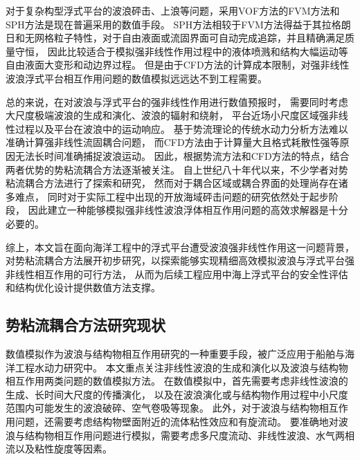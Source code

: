 对于复杂构型浮式平台的波浪砰击、上浪等问题，采用VOF方法的FVM方法和SPH方法是现在普遍采用的数值手段。%
SPH方法相较于FVM方法得益于其拉格朗日和无网格粒子特性，对于自由液面或流固界面可自动完成追踪，并且精确满足质量守恒，%
因此比较适合于模拟强非线性作用过程中的液体喷溅和结构大幅运动等自由液面大变形和动边界过程。%
但是由于CFD方法的计算成本限制，对强非线性波浪浮式平台相互作用问题的数值模拟远远达不到工程需要。%

总的来说，在对波浪与浮式平台的强非线性作用进行数值预报时，%
需要同时考虑大尺度极端波浪的生成和演化、波浪的辐射和绕射，%
平台近场小尺度区域强非线性过程以及平台在波浪中的运动响应。%
基于势流理论的传统水动力分析方法难以准确计算强非线性流固耦合问题，%
而CFD方法由于计算量大且格式耗散性强等原因无法长时间准确捕捉波浪运动。%
因此，根据势流方法和CFD方法的特点，结合两者优势的势粘流耦合方法逐渐被关注。%
自上世纪八十年代以来，不少学者对势粘流耦合方法进行了探索和研究，%
然而对于耦合区域或耦合界面的处理尚存在诸多难点，%
同时对于实际工程中出现的开放海域砰击问题的研究依然处于起步阶段\cite{choiGrid2GridHOSWrapper2017}，%
因此建立一种能够模拟强非线性波浪浮体相互作用问题的高效求解器是十分必要的。%

综上，本文旨在面向海洋工程中的浮式平台遭受波浪强非线性作用这一问题背景，%
对势粘流耦合方法展开初步研究，以探索能够实现精细高效模拟波浪与浮式平台强非线性相互作用的可行方法，%
从而为后续工程应用中海上浮式平台的安全性评估和结构优化设计提供数值方法支撑。%

\subsection{
  \texorpdfstring{势粘流耦合方法研究现状} %
  {\thesubsection 势粘流耦合方法研究现状} %
}
\label{ssec:势粘流耦合方法研究现状}

数值模拟作为波浪与结构物相互作用研究的一种重要手段，被广泛应用于船舶与海洋工程水动力研究中。%
本文重点关注非线性波浪的生成和演化以及波浪与结构物相互作用两类问题的数值模拟方法。%
在数值模拟中，首先需要考虑非线性波浪的生成、长时间大尺度的传播演化，%
以及在波浪演化或与结构物作用过程中小尺度范围内可能发生的波浪破碎、空气卷吸等现象。%
此外，对于波浪与结构物相互作用问题，还需要考虑结构物壁面附近的流体粘性效应和有旋流动。%
要准确地对波浪与结构物相互作用问题进行模拟，需要考虑多尺度流动、非线性波浪、水气两相流以及粘性旋度等因素。%

